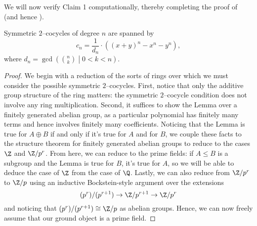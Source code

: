 We will now verify Claim 1 computationally, thereby completing the proof of  (and hence ).

\begin{lemma}\label{Symmetric2CocycleLemma}
Symmetric \(2\)--cocycles of degree \(n\) are spanned by \[c_n = \frac{1}{d_n} \cdot ((x + y)^n - x^n - y^n),\] where \(d_n = \gcd\left( \binom{n}{k} \middle| 0 < k < n \right)\).
\end{lemma}
\begin{proof}
We begin with a reduction of the sorts of rings over which we must consider the possible symmetric \(2\)--cocycles.  First, notice that only the additive group structure of the ring matters: the symmetric \(2\)--cocycle condition does not involve any ring multiplication.  Second, it suffices to show the Lemma over a finitely generated abelian group, as a particular polynomial has finitely many terms and hence involves finitely many coefficients.  Noticing that the Lemma is true for \(A \oplus B\) if and only if it's true for \(A\) and for \(B\), we couple these facts to the structure theorem for finitely generated abelian groups to reduce to the cases \(\Z\) and \(\Z/p^r\).  From here, we can reduce to the prime fields: if \(A \le B\) is a subgroup and the Lemma is true for \(B\), it's true for \(A\), so we will be able to deduce the case of \(\Z\) from the case of \(\Q\).  Lastly, we can also reduce from \(\Z/p^r\) to \(\Z/p\) using an inductive Bockstein-style argument over the extensions \[(p^r) / (p^{r+1}) \to \Z/p^{r+1} \to \Z/p^r\] and noticing that \((p^r) / (p^{r+1}) \cong \Z/p\) as abelian groups.  Hence, we can now freely assume that our ground object is a prime field.


\end{proof}
